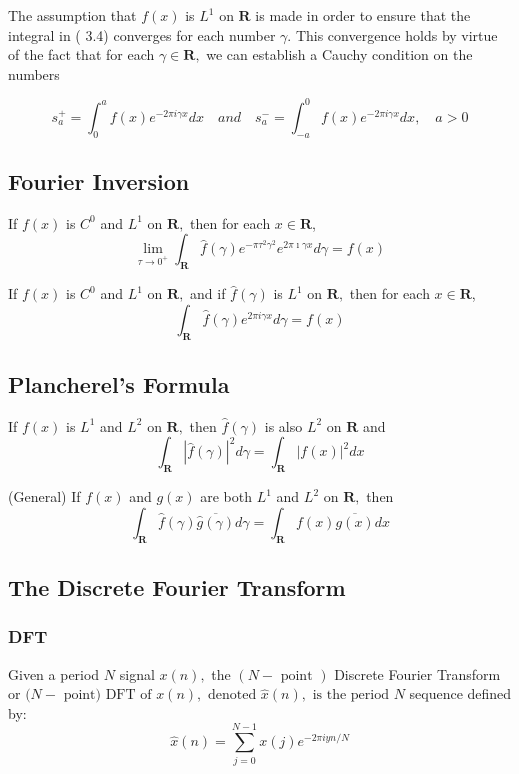 The assumption that $f(x)$ is $L^{1}$ on $\mathbf{R}$ is made in order to ensure that the integral in ( 3.4) converges for each number $\gamma$. This convergence holds by virtue of the fact that for each $\gamma \in \mathbf{R},$ we can establish a Cauchy condition on the numbers

$$
s_{a}^{+}=\int_{0}^{a} f(x) e^{-2 \pi i \gamma x} d x \quad and \quad s_{a}^{-}=\int_{-a}^{0} f(x) e^{-2 \pi i \gamma x} d x, \quad a>0
$$

\subsection{Fourier Inversion}

\begin{theorem}
If $f(x)$ is $C^{0}$ and $L^{1}$ on $\mathbf{R},$ then for each $x \in \mathbf{R}$,
$$
\lim _{\tau \rightarrow 0^{+}} \int_{\mathbf{R}} \widehat{f}(\gamma) e^{-\pi \tau^{2} \gamma^{2}} e^{2 \pi \imath \gamma x} d \gamma=f(x)
$$

\begin{corollary}
If $f(x)$ is $C^{0}$ and $L^{1}$ on $\mathbf{R},$ and if $\hat{f}(\gamma)$ is $L^{1}$ on $\mathbf{R},$ then
for each $x \in \mathbf{R}$,
$$
\int_{\mathbf{R}} \widehat{f}(\gamma) e^{2 \pi i \gamma x} d \gamma=f(x)
$$
\end{corollary}
\end{theorem}

\subsection{Plancherel's Formula}

If $f(x)$ is $L^{1}$ and $L^{2}$ on $\mathbf{R},$ then 
$\hat{f}(\gamma)$
is also $L^{2}$ on $\mathbf{R}$ and
$$
\int_{\mathbf{R}}|\widehat{f}(\gamma)|^{2} d \gamma=\int_{\mathbf{R}}|f(x)|^{2} d x
$$

\begin{theorem}
(General) If $f(x)$ and $g(x)$ are both $L^{1}$ and $L^{2}$ on
$\mathbf{R},$ then
$$
\int_{\mathbf{R}} \widehat{f}(\gamma) \overline{\widehat{g}(\gamma)} d \gamma=\int_{\mathbf{R}} f(x) \overline{g(x)} d x
$$
\end{theorem}

\subsection{The Discrete Fourier Transform}
\subsubsection{DFT}
\begin{definition}
Given a period $N$ signal $x(n),$ the $(N-\text { point })$ Discrete Fourier Transform or $(N-\text { point) DFT of } x(n), \text { denoted } \widehat{x}(n), \text { is the period } N$ sequence defined by:
$$
\widehat{x}(n)=\sum_{j=0}^{N-1} x(j) e^{-2 \pi i y n / N}
$$
\end{definition}

